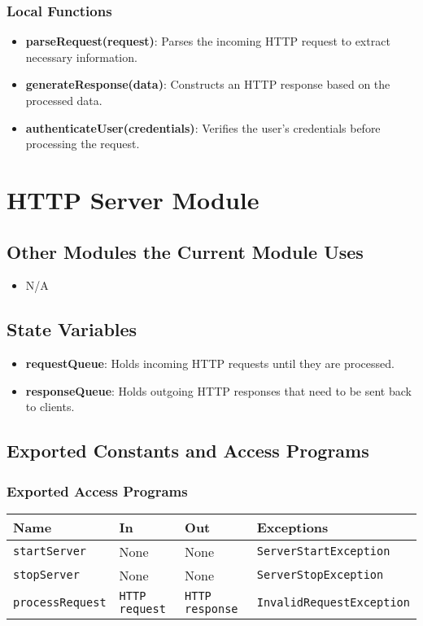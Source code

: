 \documentclass[12pt, titlepage]{article}
\begin{document}
\subsubsection{Local Functions}
\begin{itemize}
  \item \textbf{parseRequest(request)}: Parses the incoming HTTP request to extract necessary information.
  \item \textbf{generateResponse(data)}: Constructs an HTTP response based on the processed data.
  \item \textbf{authenticateUser(credentials)}: Verifies the user's credentials before processing the request.
\end{itemize}
\newpage

\newpage
\section{HTTP Server Module}

\subsection{Other Modules the Current Module Uses}
\begin{itemize}
\item N/A
\end{itemize}

\subsection{State Variables}
\begin{itemize}
    \item \textbf{requestQueue}: Holds incoming HTTP requests until they are processed.
    \item \textbf{responseQueue}: Holds outgoing HTTP responses that need to be sent back to clients.
\end{itemize}

\subsection{Exported Constants and Access Programs}
\subsubsection{Exported Access Programs}
\begin{tabular}{|l|l|l|l|}
    \hline
    \textbf{Name} & \textbf{In} & \textbf{Out} & \textbf{Exceptions} \\
    \hline
    \texttt{startServer} & None & None & \texttt{ServerStartException} \\
    \texttt{stopServer} & None & None & \texttt{ServerStopException} \\
    \texttt{processRequest} & \texttt{HTTP request} & \texttt{HTTP response} & \texttt{InvalidRequestException} \\
    \hline
\end{tabular}
\end{document}
